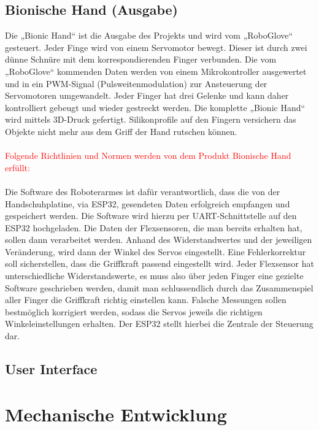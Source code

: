 \documentclass[11pt]{article}
\begin{document}
\subsection{Bionische Hand (Ausgabe)}
Die „Bionic Hand“ ist die Ausgabe des Projekts und wird vom „RoboGlove“ gesteuert. Jeder Finge wird von einem Servomotor 
bewegt. Dieser ist durch zwei dünne Schnüre mit dem korrespondierenden Finger verbunden. Die vom „RoboGlove“ kommenden 
Daten werden von einem Mikrokontroller ausgewertet und in ein PWM-Signal (Pulsweitenmodulation) zur Ansteuerung der 
Servomotoren umgewandelt. Jeder Finger hat drei Gelenke und kann daher kontrolliert gebeugt und wieder gestreckt werden. 
Die komplette „Bionic Hand“ wird mittels 3D-Druck gefertigt. Silikonprofile auf den Fingern versichern das Objekte nicht 
mehr aus dem Griff der Hand rutschen können.\\
\\
\textcolor{red}{Folgende Richtlinien und Normen werden von dem Produkt Bionische Hand erfüllt:}\\
\\
Die Software des Roboterarmes ist dafür verantwortlich, dass die von der Handschuhplatine, via ESP32, gesendeten Daten 
erfolgreich empfangen und gespeichert werden. Die Software wird hierzu per UART-Schnittstelle auf den ESP32 hochgeladen. 
Die Daten der Flexsensoren, die man bereits erhalten hat, sollen dann verarbeitet werden. Anhand des Widerstandwertes und 
der jeweiligen Veränderung, wird dann der Winkel des Servos eingestellt. Eine Fehlerkorrektur soll sicherstellen, dass die 
Griffkraft passend eingestellt wird. Jeder Flexsensor hat unterschiedliche Widerstandswerte, es muss also über jeden Finger 
eine gezielte Software geschrieben werden, damit man schlussendlich durch das Zusammenspiel aller Finger die Griffkraft 
richtig einstellen kann. Falsche Messungen sollen bestmöglich korrigiert werden, sodass die Servos jeweils die richtigen 
Winkeleinstellungen erhalten. Der ESP32 stellt hierbei die Zentrale der Steuerung dar.

\subsection{User Interface}


\section{Mechanische Entwicklung}
\end{document}
